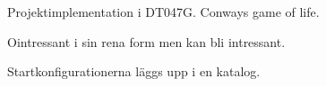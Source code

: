 Projektimplementation i DT047G. Conways game of life.

Ointressant i sin rena form men kan bli intressant.

Startkonfigurationerna läggs upp i en katalog. 